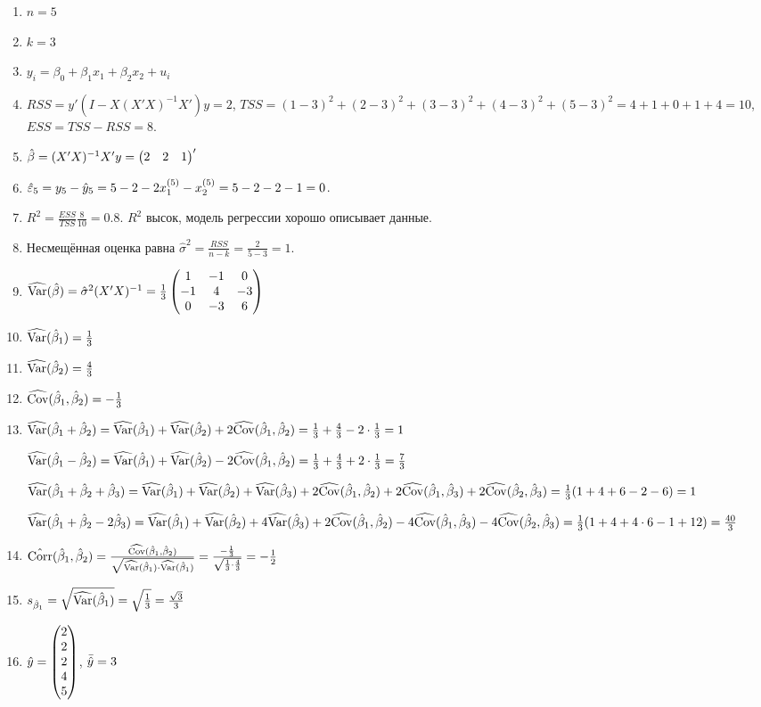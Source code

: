 \begin{problem}
\begin{sol}
\begin{enumerate}
\item $n=5$
\item $k=3$
\item $y_i=\beta_0+\beta_1x_1+\beta_2x_2+u_i$
\item $RSS=y'(I-X(X'X)^{-1}X')y=2$, $TSS=(1-3)^2+(2-3)^2+(3-3)^2+(4-3)^2+(5-3)^2=4+1+0+1+4=10$, $ESS=TSS-RSS=8$.
\item $\hat{\beta}=(X'X)^{-1}X'y=\begin{pmatrix}2 & 2 & 1\end{pmatrix}'$
\item $\hat{\varepsilon}_5=y_5-\hat{y}_5=5-2-2x^{(5)}_1-x^{(5)}_2=5-2-2-1=0$.
\item $R^2=\frac{ESS}{TSS}\frac{8}{10}=0.8$. $R^2$ высок, модель регрессии хорошо описывает данные.
\item Несмещённая оценка равна $\hat\sigma^2=\frac{RSS}{n-k}=\frac{2}{5-3}=1$.
\item $\widehat{\operatorname{Var}}(\hat{\beta})=\hat\sigma^2(X'X)^{-1}=\frac13\begin{pmatrix}
1&-1&0\\
-1&4&-3\\
0&-3&6
\end{pmatrix}
$
\item $\widehat{\operatorname{Var}}(\hat\beta_1)=\frac13$
\item $\widehat{\operatorname{Var}}(\hat\beta_2)=\frac43$
\item $\widehat{\operatorname{Cov}}(\hat\beta_1,\hat\beta_2)=-\frac13$
\item $\widehat{\operatorname{Var}}(\hat\beta_1+\hat\beta_2)=\widehat{\operatorname{Var}}(\hat\beta_1)+\widehat{\operatorname{Var}}(\hat\beta_2)+2\widehat{\operatorname{Cov}}(\hat\beta_1,\hat\beta_2)=\frac13+\frac43-2\cdot\frac13=1$

$\widehat{\operatorname{Var}}(\hat\beta_1-\hat\beta_2)=\widehat{\operatorname{Var}}(\hat\beta_1)+\widehat{\operatorname{Var}}(\hat\beta_2)-2\widehat{\operatorname{Cov}}(\hat\beta_1,\hat\beta_2)=\frac13+\frac43+2\cdot\frac13=\frac73$

$\widehat{\operatorname{Var}}(\hat\beta_1+\hat\beta_2+\hat\beta_3)=\widehat{\operatorname{Var}}(\hat\beta_1)+\widehat{\operatorname{Var}}(\hat\beta_2)+\widehat{\operatorname{Var}}(\hat\beta_3)+2\widehat{\operatorname{Cov}}(\hat\beta_1,\hat\beta_2)+2\widehat{\operatorname{Cov}}(\hat\beta_1,\hat\beta_3)+2\widehat{\operatorname{Cov}}(\hat\beta_2,\hat\beta_3)=\frac13(1+4+6-2-6)=1$

$\widehat{\operatorname{Var}}(\hat\beta_1+\hat\beta_2-2\hat\beta_3)=\widehat{\operatorname{Var}}(\hat\beta_1)+\widehat{\operatorname{Var}}(\hat\beta_2)+4\widehat{\operatorname{Var}}(\hat\beta_3)+2\widehat{\operatorname{Cov}}(\hat\beta_1,\hat\beta_2)-4\widehat{\operatorname{Cov}}(\hat\beta_1,\hat\beta_3)-4\widehat{\operatorname{Cov}}(\hat\beta_2,\hat\beta_3)=\frac13(1+4+4\cdot 6-1+12)=\frac{40}{3}$
\item $\hat{\operatorname{Corr}}(\hat\beta_1,\hat\beta_2)=\frac{\widehat{\operatorname{Cov}}(\hat\beta_1,\hat\beta_2)}{\sqrt{\widehat{\operatorname{Var}}(\hat\beta_1)\cdot\widehat{\operatorname{Var}}(\hat\beta_1)}}=\frac{-\frac13}{\sqrt{\frac13\cdot\frac43}}=-\frac12$
\item $s_{\hat\beta_1}=\sqrt{\widehat{\operatorname{Var}}(\hat\beta_1)}=\sqrt{\frac13}=\frac{\sqrt3}{3}$
\item $\hat{y}=\begin{pmatrix}
2\\
2\\
2\\
4\\
5
\end{pmatrix}$, $\bar {\hat{y}}=3$


\end{enumerate}
\end{sol}
\end{problem}
